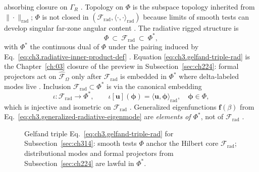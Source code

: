absorbing closure on \(\Gamma_R\) \cite{harrington2001}. Topology on \(\Phi\) is the subspace topology
inherited from \(\|\cdot\|_{\mathrm{rad}}\); \(\Phi\) is not closed in
\((\mathcal{F}_{\mathrm{rad}},\langle\cdot,\cdot\rangle_{\mathrm{rad}})\) because limits of smooth tests
can develop singular far-zone angular content \cite{kato1995}.
The radiative rigged structure is
\begin{equation}
\label{eq:ch3.gelfand-triple-rad}
\Phi
\ \subset\
\mathcal{F}_{\mathrm{rad}}
\ \subset\
\Phi^{*},
\end{equation}
with \(\Phi^{*}\) the continuous dual of \(\Phi\) under the pairing induced by
Eq.~\eqref{eq:ch3.radiative-inner-product-def} \cite{kato1995}. Equation
\eqref{eq:ch3.gelfand-triple-rad} is the Chapter~\ref{ch:03} closure of the preview in
Subsection~\ref{sec:ch224}: formal projectors act on \(\widehat{\mathcal{F}}_\Omega\) only after
\(\mathcal{F}_{\mathrm{rad}}\) is embedded in \(\Phi^{*}\) where delta-labeled modes live
\cite{stratton1941}. Inclusion \(\mathcal{F}_{\mathrm{rad}}\subset\Phi^{*}\) is via the
canonical embedding
\begin{equation}
\label{eq:ch3.canonical-embedding-rad-dual}
\iota:\mathcal{F}_{\mathrm{rad}}\to\Phi^{*},
\qquad
\iota[\mathbf{u}](\boldsymbol{\phi})
=
\langle \mathbf{u},\boldsymbol{\phi}\rangle_{\mathrm{rad}},
\quad
\boldsymbol{\phi}\in\Phi,
\end{equation}
which is injective and isometric on \(\mathcal{F}_{\mathrm{rad}}\) \cite{kato1995}. Generalized
eigenfunctions \(\mathbf{f}(\beta)\) from Eq.~\eqref{eq:ch3.generalized-radiative-eigenmode} are
\emph{elements of \(\Phi^{*}\)}, not of \(\mathcal{F}_{\mathrm{rad}}\) \cite{harrington2001}.
\begin{figure}[t]
\centering
{}
\caption{Gelfand triple Eq.~\eqref{eq:ch3.gelfand-triple-rad} for Subsection~\ref{sec:ch314}: smooth tests
\(\Phi\) anchor the Hilbert core \(\mathcal{F}_{\mathrm{rad}}\); distributional modes and formal projectors
from Subsection~\ref{sec:ch224} are lawful in \(\Phi^{*}\).}
\label{fig:ch3.gelfand-triple-radiative}
\end{figure}

